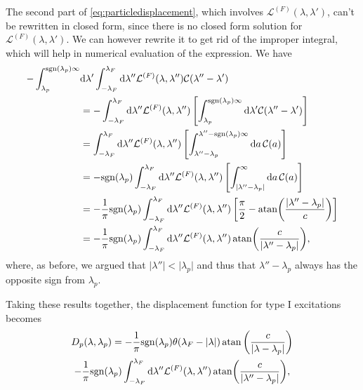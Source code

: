 \documentclass[11pt, a4paper]{report} %
\newcommand{\inversetruncc}{\mathcal{L}}
\newcommand{\kernel}{\mathcal{C}}
\begin{document}
The second part of \cref{eq:particledisplacement}, which involves \(\inversetruncc^{(F)}(\lambda,\lambda')\), can't be rewritten in closed form, since there is no closed form solution for \(\inversetruncc^{(F)}(\lambda,\lambda')\).
We can however rewrite it to get rid of the improper integral, which will help in numerical evaluation of the expression.
We have
\begin{align}
	- \int_{\lambda_p}^{\textrm{sgn}(\lambda_p)\infty} &\dd \lambda' \int_{-\lambda_F}^{\lambda_F} \dd \lambda''  \inversetruncc^{(F)}(\lambda,\lambda'') \kernel(\lambda''-\lambda')\\
	&= -  \int_{-\lambda_F}^{\lambda_F} \dd \lambda''   \inversetruncc^{(F)}(\lambda,\lambda'') \left[\int_{\lambda_p}^{\textrm{sgn}(\lambda_p)\infty} \dd \lambda'\kernel(\lambda''-\lambda') \right]\\
	&=   \int_{-\lambda_F}^{\lambda_F} \dd \lambda''   \inversetruncc^{(F)}(\lambda,\lambda'') \left[\int_{\lambda''-\lambda_p}^{\lambda''-\textrm{sgn}(\lambda_p)\infty} \dd a\,\kernel(a) \right]\\
	&= -\textrm{sgn}(\lambda_p) \int_{-\lambda_F}^{\lambda_F} \dd \lambda''   \inversetruncc^{(F)}(\lambda,\lambda'') \left[\int_{\lvert\lambda''-\lambda_p\rvert}^{\infty} \dd a\,\kernel(a) \right]\\
	&= -\frac{1}{\pi}\textrm{sgn}(\lambda_p) \int_{-\lambda_F}^{\lambda_F} \dd \lambda''   \inversetruncc^{(F)}(\lambda,\lambda'') \left[\frac{\pi}{2} - \atan(\frac{\lvert\lambda''-\lambda_p\rvert}{c})\right]\\
	&= -\frac{1}{\pi}\textrm{sgn}(\lambda_p) \int_{-\lambda_F}^{\lambda_F} \dd \lambda''   \inversetruncc^{(F)}(\lambda,\lambda'') \atan(\frac{c}{\lvert\lambda''-\lambda_p\rvert}),
\end{align}
where, as before, we argued that \(\lvert\lambda''\rvert < \lvert\lambda_p\rvert\) and thus that \(\lambda'' - \lambda_p\) always has the opposite sign from \(\lambda_p\).

Taking these results together, the displacement function for type I excitations becomes 
\begin{multline}
	D_p(\lambda, \lambda_p) = - \frac{1}{\pi} \textrm{sgn}(\lambda_p) \theta(\lambda_F - \lvert \lambda \rvert)  \atan\left(\frac{c}{\lvert\lambda-\lambda_p\rvert}\right) \\-\frac{1}{\pi}\textrm{sgn}(\lambda_p) \int_{-\lambda_F}^{\lambda_F} \dd \lambda''   \inversetruncc^{(F)}(\lambda,\lambda'') \atan(\frac{c}{\lvert\lambda''-\lambda_p\rvert}),
\end{multline}
\end{document}
